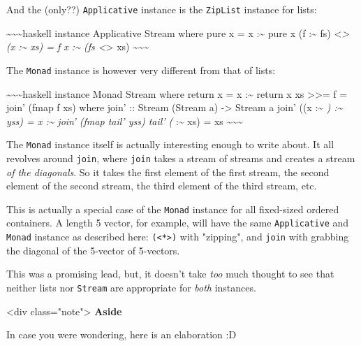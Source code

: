 \documentclass[]{article}
\begin{document}
And the (only??) \texttt{Applicative} instance is the \texttt{ZipList} instance
for lists:

\textasciitilde{}\textasciitilde{}\textasciitilde{}haskell instance Applicative
Stream where pure x = x :\textasciitilde{} pure x (f :\textasciitilde{} fs)
\textless{}\emph{\textgreater{} (x :\textasciitilde{} xs) = f x
:\textasciitilde{} (fs \textless{}}\textgreater{} xs)
\textasciitilde{}\textasciitilde{}\textasciitilde{}

The \texttt{Monad} instance is however very different from that of lists:

\textasciitilde{}\textasciitilde{}\textasciitilde{}haskell instance Monad Stream
where return x = x :\textasciitilde{} return x xs \textgreater{}\textgreater{}=
f = join' (fmap f xs) where join' :: Stream (Stream a) -\textgreater{} Stream a
join' ((x :\textasciitilde{} \emph{) :\textasciitilde{} yss) = x
:\textasciitilde{} join' (fmap tail' yss) tail' (} :\textasciitilde{} xs) = xs
\textasciitilde{}\textasciitilde{}\textasciitilde{}

The \texttt{Monad} instance itself is actually interesting enough to write
about. It all revolves around \texttt{join}, where \texttt{join} takes a stream
of streams and creates a stream \emph{of the diagonals}. So it takes the first
element of the first stream, the second element of the second stream, the third
element of the third stream, etc.

This is actually a special case of the \texttt{Monad} instance for all
fixed-sized ordered containers. A length 5 vector, for example, will have the
same \texttt{Applicative} and \texttt{Monad} instance as described here:
\texttt{(\textless{}*\textgreater{})} with "zipping", and \texttt{join} with
grabbing the diagonal of the 5-vector of 5-vectors.

This was a promising lead, but, it doesn't take \emph{too} much thought to see
that neither lists nor \texttt{Stream} are appropriate for \emph{both}
instances.

\textless{}div class="note"\textgreater{} \textbf{Aside}

In case you were wondering, here is an elaboration :D
\end{document}
